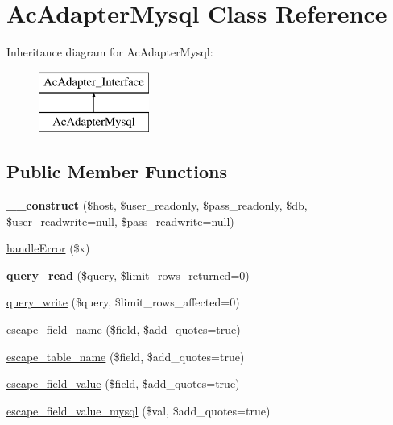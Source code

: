 \hypertarget{class_ac_adapter_mysql}{\section{\-Ac\-Adapter\-Mysql \-Class \-Reference}
\label{class_ac_adapter_mysql}
}
\-Inheritance diagram for \-Ac\-Adapter\-Mysql\-:\begin{figure}[H]
\begin{center}
\leavevmode
\includegraphics[height=2.000000cm]{class_ac_adapter_mysql}
\end{center}
\end{figure}
\subsection*{\-Public \-Member \-Functions}
\begin{DoxyCompactItemize}
\item 
\hypertarget{class_ac_adapter_mysql_a37b4bc93c9c272f5445684bde4dbc146}{{\bfseries \-\_\-\-\_\-construct} (\$host, \$user\-\_\-readonly, \$pass\-\_\-readonly, \$db, \$user\-\_\-readwrite=null, \$pass\-\_\-readwrite=null)}\label{class_ac_adapter_mysql_a37b4bc93c9c272f5445684bde4dbc146}

\item 
\hyperlink{class_ac_adapter_mysql_aeeee23d0e38616ec3b791724797a7ec3}{handle\-Error} (\$x)
\item 
\hypertarget{class_ac_adapter_mysql_a15017b3c0d06c7835f53d80d1120c6d8}{{\bfseries query\-\_\-read} (\$query, \$limit\-\_\-rows\-\_\-returned=0)}\label{class_ac_adapter_mysql_a15017b3c0d06c7835f53d80d1120c6d8}

\item 
\hyperlink{class_ac_adapter_mysql_a88b72551fdaca2b723311529f7ba8f3e}{query\-\_\-write} (\$query, \$limit\-\_\-rows\-\_\-affected=0)
\item 
\hyperlink{class_ac_adapter_mysql_a507156ce9b650fc46643590b2e779742}{escape\-\_\-field\-\_\-name} (\$field, \$add\-\_\-quotes=true)
\item 
\hyperlink{class_ac_adapter_mysql_aa8dffaf4018c2981010b9f9cdf66fd0d}{escape\-\_\-table\-\_\-name} (\$field, \$add\-\_\-quotes=true)
\item 
\hyperlink{class_ac_adapter_mysql_a0c6e0af397fa013d20122f6ed136f8da}{escape\-\_\-field\-\_\-value} (\$field, \$add\-\_\-quotes=true)
\item 
\hyperlink{class_ac_adapter_mysql_abf0fe85a87fbbed006220c4cbe5d24d8}{escape\-\_\-field\-\_\-value\-\_\-mysql} (\$val, \$add\-\_\-quotes=true)
\end{DoxyCompactItemize}


